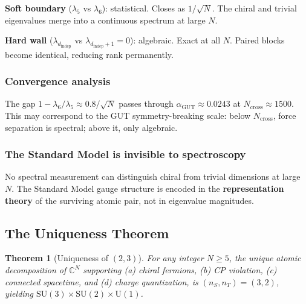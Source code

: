 \documentclass[12pt]{article}
\newtheorem{theorem}{Theorem}[section]
\theoremstyle{remark}
\theoremstyle{definition}
\newcommand{\CC}{\mathbb{C}}
\newcommand{\agut}{\alpha_{\mathrm{GUT}}}
\begin{document}
\textbf{Soft boundary} ($\lambda_5$ vs $\lambda_6$): statistical. Closes as $1/\sqrt{N}$. The chiral and trivial eigenvalues merge into a continuous spectrum at large $N$.

\textbf{Hard wall} ($\lambda_{d_\text{indep}}$ vs $\lambda_{d_\text{indep}+1} = 0$): algebraic. Exact at all $N$. Paired blocks become identical, reducing rank permanently.

\subsubsection{Convergence analysis}

The gap $1 - \lambda_6/\lambda_5 \approx 0.8/\sqrt{N}$ passes through $\agut \approx 0.0243$ at $N_\text{cross} \approx 1500$. This may correspond to the GUT symmetry-breaking scale: below $N_\text{cross}$, force separation is spectral; above it, only algebraic.

\subsubsection{The Standard Model is invisible to spectroscopy}

No spectral measurement can distinguish chiral from trivial dimensions at large $N$. The Standard Model gauge structure is encoded in the \textbf{representation theory} of the surviving atomic pair, not in eigenvalue magnitudes.

\subsection{The Uniqueness Theorem}

\begin{theorem}[Uniqueness of $(2,3)$]
For any integer $N \geq 5$, the unique atomic decomposition of $\CC^N$ supporting (a) chiral fermions, (b) CP violation, (c) connected spacetime, and (d) charge quantization, is $(n_S, n_T) = (3, 2)$, yielding $\text{SU}(3)\times\text{SU}(2)\times\text{U}(1)$.
\end{theorem}
\end{document}
